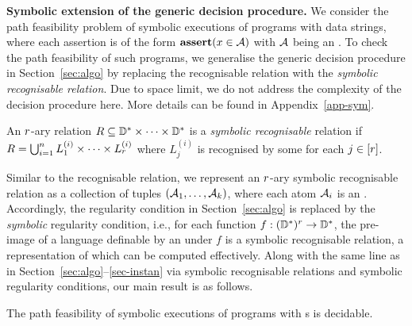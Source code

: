 \smallskip
\noindent
\textbf{Symbolic extension of the generic decision procedure.} We consider the path feasibility problem of symbolic executions of programs with data strings, 
 where each assertion is of the form $\textbf{assert}(x \in \mathcal{A})$ with $\mathcal{A}$ being an \SA. 
To check the path feasibility of such programs, we generalise the generic decision procedure in Section~\ref{sec:algo} by replacing the recognisable relation  with the \emph{symbolic recognisable relation}. 
Due to space limit, we do not address the complexity of the decision procedure here. More details can be found in Appendix~\ref{app-sym}.

\begin{definition}[Symbolic recognisable relations]
	An $r$-ary relation $R \subseteq \mathbb{D}^*\times \cdots\times \mathbb{D}^*$ is a \emph{symbolic recognisable} relation if $R=\bigcup_{i=1}^n L^{(i)}_1 \times \cdots \times L^{(i)}_r$ where $L^{(i)}_j$ is recognised by some \SA{} for each $j\in [r]$.
\end{definition}
Similar to the recognisable relation, we represent an $r$-ary symbolic recognisable relation as a collection of tuples $(\mathcal{A}_1, \ldots, \mathcal{A}_k)$, where each atom $\mathcal{A}_i$ is an \SA{}.
Accordingly, the regularity condition in Section~\ref{sec:algo} is replaced by the \emph{symbolic} regularity condition, i.e., for each function $f: (\mathbb{D}^*)^r \to \mathbb{D}^*$, the pre-image of a language definable by an \SA{} under $f$ is a symbolic recognisable relation, a representation of which can be computed effectively. Along with the same line as in Section~\ref{sec:algo}--\ref{sec-instan} via symbolic recognisable relations and symbolic regularity conditions, our main result is as follows. 

\begin{theorem}
The path feasibility of symbolic executions of programs with %
 \SSPT{}s %
is decidable.
\end{theorem}






